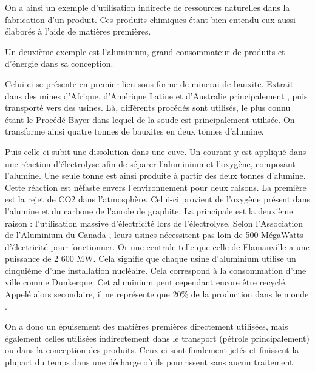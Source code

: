 On a ainsi un exemple d'utilisation indirecte de ressources naturelles dans la fabrication d'un produit. Ces produits chimiques étant bien entendu eux aussi élaborés à l'aide de matières premières. 

\medbreak Un deuxième exemple est l'aluminium, grand consommateur de produits et d’énergie dans sa conception.

Celui-ci se présente en premier lieu sous forme de minerai de bauxite. Extrait dans des mines d'Afrique, d'Amérique Latine et d'Australie principalement \cite{aluZonesExtraction}, puis transporté vers des usines. Là, différents procédés sont utilisés, le plus connu étant le Procédé Bayer dans lequel de la soude est principalement utilisée. On transforme ainsi quatre tonnes de bauxites en deux tonnes d'alumine. 

Puis celle-ci subit une dissolution dans une cuve. Un courant y est appliqué dans une réaction d'électrolyse afin de séparer l'aluminium et l'oxygène, composant l'alumine. Une seule tonne est ainsi produite à partir des deux tonnes d'alumine. Cette réaction est néfaste envers l'environnement pour deux raisons. La première est la rejet de CO2 dans l'atmosphère. Celui-ci provient de l'oxygène présent dans l'alumine et du carbone de l'anode de graphite. La principale est la deuxième raison : l'utilisation massive d’électricité lors de l'électrolyse. Selon l'Association de l'Aluminium du Canada \cite{consomUsinesAlu}, leurs usines nécessitent pas loin de 500 MégaWatts d’électricité pour fonctionner. Or une centrale telle que celle de Flamanville a une puissance de 2 600 MW. Cela signifie que chaque usine d'aluminium utilise un cinquième d'une installation nucléaire. Cela correspond à la consommation d'une ville comme Dunkerque.
Cet aluminium peut cependant encore être recyclé. Appelé alors secondaire, il ne représente que 20\% de la production dans le monde \cite{worldAluProdRecycl}. 

\bigbreak On a donc un épuisement des matières premières directement utilisées, mais également celles utilisées indirectement dans le transport (pétrole principalement) ou dans la conception des produits. Ceux-ci sont finalement jetés et finissent la plupart du temps dans une décharge où ils pourrissent sans aucun traitement.

